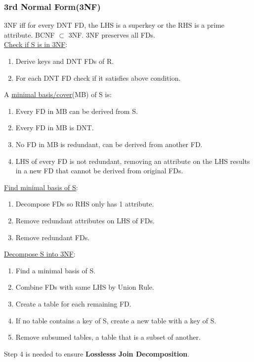 \begin{multicols*}{3}
\subsubsection{3rd Normal Form(3NF)}
3NF iff for every DNT FD, the LHS is a superkey or the RHS is a prime attribute. BCNF $\subset$ 3NF. 3NF preserves all FDs.\\
\underline{Check if S is in 3NF}: 
\begin{enumerate}[leftmargin=*]
    \item Derive keys and DNT FDs of R.
    \item For each DNT FD check if it satisfies above condition.
\end{enumerate}
A \underline{minimal basis/cover}(MB) of S is:
\begin{enumerate}[leftmargin=*]
    \item Every FD in MB can be derived from S.
    \item Every FD in MB is DNT.
    \item No FD in MB is redundant, can be derived from another FD.
    \item LHS of every FD is not redundant, removing an attribute on the LHS results in a new FD that cannot be derived from original FDs.
\end{enumerate}
\underline{Find minimal basis of S}:
\begin{enumerate}[leftmargin=*]
    \item Decompose FDs so RHS only has 1 attribute.
    \item Remove redundant attributes on LHS of FDs.
    \item Remove redundant FDs.
\end{enumerate}
\underline{Decompose S into 3NF}:
\begin{enumerate}[leftmargin=*]
    \item Find a minimal basis of S.
    \item Combine FDs with same LHS by Union Rule. 
    \item Create a table for each remaining FD.
    \item If no table contains a key of S, create a new table with a key of S.
    \item Remove subsumed tables, a table that is a subset of another.
\end{enumerate}
Step 4 is needed to ensure \textbf{Losslesss Join Decomposition}.

\end{multicols*}